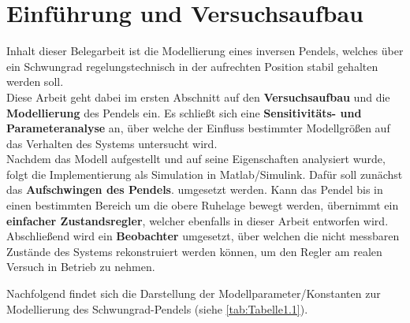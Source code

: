 \pagestyle{aaron}
\section{Einführung und Versuchsaufbau} \label{sec:Einfuehrung}

Inhalt dieser Belegarbeit ist die Modellierung eines inversen Pendels, welches über ein Schwungrad regelungstechnisch in der aufrechten Position stabil gehalten werden soll.\\
Diese Arbeit geht dabei im ersten Abschnitt auf den \textbf{Versuchsaufbau} und die \textbf{Modellierung} des Pendels ein. Es schließt sich eine \textbf{Sensitivitäts- und Parameteranalyse} an, über welche der Einfluss bestimmter Modellgrößen auf das Verhalten des Systems untersucht wird. \\
Nachdem das Modell aufgestellt und auf seine Eigenschaften analysiert wurde, folgt die Implementierung als Simulation in Matlab/Simulink. Dafür soll zunächst das \textbf{Aufschwingen des Pendels}. umgesetzt werden. Kann das Pendel bis in einen bestimmten Bereich um die obere Ruhelage bewegt werden, übernimmt ein \textbf{einfacher Zustandsregler}, welcher ebenfalls in dieser Arbeit entworfen wird. \\
Abschließend wird ein \textbf{Beobachter} umgesetzt, über welchen die nicht messbaren Zustände des Systems rekonstruiert werden können, um den Regler am realen Versuch in Betrieb zu nehmen.

Nachfolgend findet sich die Darstellung der Modellparameter/Konstanten zur Modellierung des Schwungrad-Pendels (siehe \autoref{tab:Tabelle1.1}).

